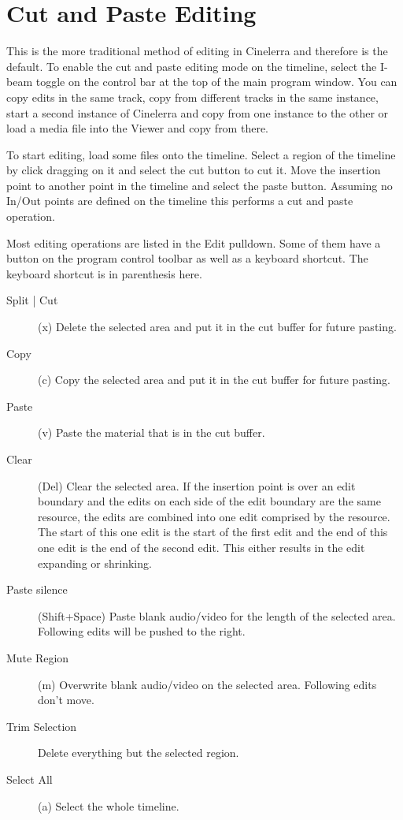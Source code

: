 \section{Cut and Paste Editing}%
\label{sec:cut_paste_editing}

This is the more traditional method of editing in Cinelerra and therefore is the default.  To enable the cut and paste editing mode on the timeline, select the I-beam toggle on the control bar at the top of the main program window. You can copy edits in the same track, copy from different tracks in the same instance, start a second instance of Cinelerra and copy from one instance to the other or load a media file into the Viewer and copy from there.

To start editing, load some files onto the timeline.  Select a region of the timeline by click dragging on it and select the cut button to cut it. Move the insertion point to another point in the timeline and select the paste button.  Assuming no In/Out points are defined on the timeline this performs a cut and paste operation.

Most editing operations are listed in the Edit pulldown. Some of them have a button on the program control toolbar as well as a keyboard shortcut.  The keyboard shortcut is in parenthesis here.

\begin{description}
    \item [Split | Cut] (x) Delete the selected area and put it in the cut buffer for future pasting.
    \item[Copy] (c) Copy the selected area and put it in the cut buffer for future pasting.
    \item[Paste] (v)  Paste the material that is in the cut buffer.
    \item[Clear] (Del)  Clear the selected area. If the insertion point is over an edit boundary and the edits on
    each side of the edit boundary are the same resource, the edits are combined into one edit comprised
    by the resource. The start of this one edit is the start of the first edit and the end of this one edit is the
    end of the second edit. This either results in the edit expanding or shrinking.
    \item[Paste silence] (Shift+Space)  Paste blank audio/video for the length of the selected area. Following
    edits will be pushed to the right.
    \item[Mute Region] (m)  Overwrite blank audio/video on the selected area. Following edits don't move.
    \item[Trim Selection] Delete everything but the selected region.
    \item[Select All] (a) Select the whole timeline.
\end{description}

